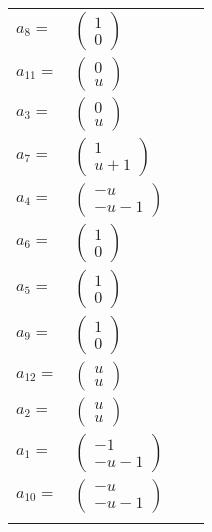 \documentclass[1p]{elsarticle_modified}
\theoremstyle{definition}
\begin{document}
\begin{tabular}{m{7pt} m{180pt} m{7pt} m{180pt} }
\flushright $a_{8}=$&$\begin{pmatrix}1\\0\end{pmatrix}$ \\
\flushright $a_{11}=$&$\begin{pmatrix}0\\u\end{pmatrix}$ \\
\flushright $a_{3}=$&$\begin{pmatrix}0\\u\end{pmatrix}$ \\
\flushright $a_{7}=$&$\begin{pmatrix}1\\u+1\end{pmatrix}$ \\
\flushright $a_{4}=$&$\begin{pmatrix}- u\\- u-1\end{pmatrix}$ \\
\flushright $a_{6}=$&$\begin{pmatrix}1\\0\end{pmatrix}$ \\
\flushright $a_{5}=$&$\begin{pmatrix}1\\0\end{pmatrix}$ \\
\flushright $a_{9}=$&$\begin{pmatrix}1\\0\end{pmatrix}$ \\
\flushright $a_{12}=$&$\begin{pmatrix}u\\u\end{pmatrix}$ \\
\flushright $a_{2}=$&$\begin{pmatrix}u\\u\end{pmatrix}$ \\
\flushright $a_{1}=$&$\begin{pmatrix}-1\\- u-1\end{pmatrix}$ \\
\flushright $a_{10}=$&$\begin{pmatrix}- u\\- u-1\end{pmatrix}$\\&\end{tabular}
\end{document}
